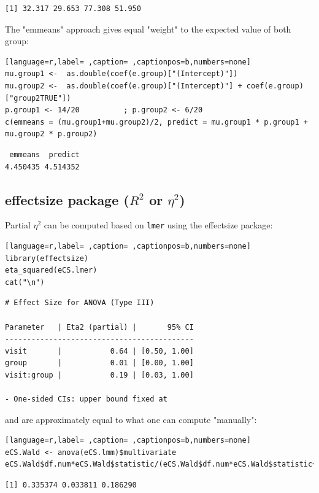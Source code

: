 \documentclass[12pt]{article}
\begin{document}
\begin{verbatim}
[1] 32.317 29.653 77.308 51.950
\end{verbatim}


The "emmeans" approach gives equal "weight" to the expected value of
both group:
\begin{lstlisting}[language=r,label= ,caption= ,captionpos=b,numbers=none]
mu.group1 <-  as.double(coef(e.group)["(Intercept)"])
mu.group2 <-  as.double(coef(e.group)["(Intercept)"] + coef(e.group)["group2TRUE"])
p.group1 <- 14/20          ; p.group2 <- 6/20
c(emmeans = (mu.group1+mu.group2)/2, predict = mu.group1 * p.group1 + mu.group2 * p.group2)
\end{lstlisting}

\begin{verbatim}
 emmeans  predict 
4.450435 4.514352
\end{verbatim}


\clearpage

\subsection{effectsize package (\(R^2\) or \(\eta^2\))}
\label{sec:org3d9e488}

Partial \(\eta^2\) can be computed based on \texttt{lmer} using the effectsize package:
\begin{lstlisting}[language=r,label= ,caption= ,captionpos=b,numbers=none]
library(effectsize)
eta_squared(eCS.lmer)
cat("\n")
\end{lstlisting}

\begin{verbatim}
# Effect Size for ANOVA (Type III)

Parameter   | Eta2 (partial) |       95% CI
-------------------------------------------
visit       |           0.64 | [0.50, 1.00]
group       |           0.01 | [0.00, 1.00]
visit:group |           0.19 | [0.03, 1.00]

- One-sided CIs: upper bound fixed at
\end{verbatim}


and are approximately equal to what one can compute "manually":
\begin{lstlisting}[language=r,label= ,caption= ,captionpos=b,numbers=none]
eCS.Wald <- anova(eCS.lmm)$multivariate
eCS.Wald$df.num*eCS.Wald$statistic/(eCS.Wald$df.num*eCS.Wald$statistic+eCS.Wald$df.denom)
\end{lstlisting}

\begin{verbatim}
[1] 0.335374 0.033811 0.186290
\end{verbatim}
\end{document}
